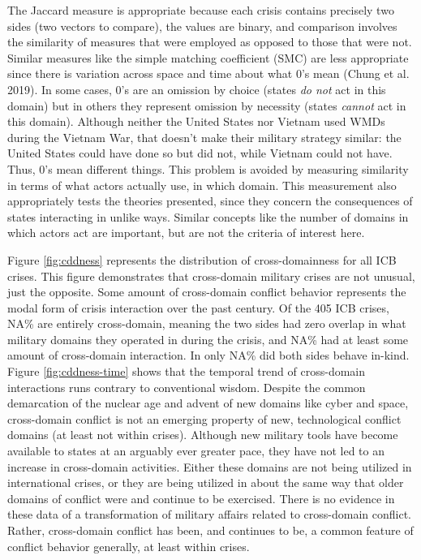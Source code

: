 \documentclass[
]{article}
\begin{document}
The Jaccard measure is appropriate because each crisis contains precisely two sides (two vectors to compare), the values are binary, and comparison involves the similarity of measures that were employed as opposed to those that were not. Similar measures like the simple matching coefficient (SMC) are less appropriate since there is variation across space and time about what 0's mean (Chung et al. 2019). In some cases, 0's are an omission by choice (states \textit{do not} act in this domain) but in others they represent omission by necessity (states \textit{cannot} act in this domain). Although neither the United States nor Vietnam used WMDs during the Vietnam War, that doesn't make their military strategy similar: the United States could have done so but did not, while Vietnam could not have. Thus, 0's mean different things. This problem is avoided by measuring similarity in terms of what actors actually use, in which domain. This measurement also appropriately tests the theories presented, since they concern the consequences of states interacting in unlike ways. Similar concepts like the number of domains in which actors act are important, but are not the criteria of interest here.

Figure \ref{fig:cddness} represents the distribution of cross-domainness for all ICB crises. This figure demonstrates that cross-domain military crises are not unusual, just the opposite. Some amount of cross-domain conflict behavior represents the modal form of crisis interaction over the past century. Of the 405 ICB crises, NA\% are entirely cross-domain, meaning the two sides had zero overlap in what military domains they operated in during the crisis, and NA\% had at least some amount of cross-domain interaction. In only NA\% did both sides behave in-kind. Figure \ref{fig:cddness-time} shows that the temporal trend of cross-domain interactions runs contrary to conventional wisdom. Despite the common demarcation of the nuclear age and advent of new domains like cyber and space, cross-domain conflict is not an emerging property of new, technological conflict domains (at least not within crises). Although new military tools have become available to states at an arguably ever greater pace, they have not led to an increase in cross-domain activities. Either these domains are not being utilized in international crises, or they are being utilized in about the same way that older domains of conflict were and continue to be exercised. There is no evidence in these data of a transformation of military affairs related to cross-domain conflict. Rather, cross-domain conflict has been, and continues to be, a common feature of conflict behavior generally, at least within crises.
\end{document}
